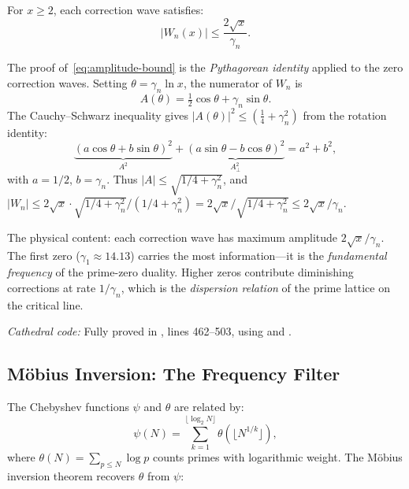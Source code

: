 \begin{theorem}
For $x \geq 2$, each correction wave satisfies:
\begin{equation}
  |W_n(x)| \leq \frac{2\sqrt{x}}{\gamma_n}.
  \label{eq:amplitude-bound}
\end{equation}
\end{theorem}

\begin{correspondence}
\label{corr:pythagorean}
The proof of~\eqref{eq:amplitude-bound} is the \emph{Pythagorean
identity} applied to the zero correction waves. Setting
$\theta = \gamma_n \ln x$, the numerator of $W_n$ is
\[
  A(\theta) = \tfrac{1}{2}\cos\theta + \gamma_n \sin\theta.
\]
The Cauchy--Schwarz inequality gives
$|A(\theta)|^2 \leq (\tfrac{1}{4} + \gamma_n^2)$ from the
rotation identity:
\[
  \underbrace{(a\cos\theta + b\sin\theta)^2}_{A^2}
  + \underbrace{(a\sin\theta - b\cos\theta)^2}_{A_\perp^2}
  = a^2 + b^2,
\]
with $a = 1/2$, $b = \gamma_n$. Thus
$|A| \leq \sqrt{1/4 + \gamma_n^2}$, and
$|W_n| \leq 2\sqrt{x} \cdot \sqrt{1/4+\gamma_n^2}/(1/4+\gamma_n^2)
= 2\sqrt{x}/\sqrt{1/4+\gamma_n^2} \leq 2\sqrt{x}/\gamma_n$.

The physical content: each correction wave has maximum amplitude
$2\sqrt{x}/\gamma_n$. The first zero ($\gamma_1 \approx 14.13$) carries
the most information---it is the \emph{fundamental frequency} of the
prime-zero duality. Higher zeros contribute diminishing corrections at
rate $1/\gamma_n$, which is the \emph{dispersion relation} of the
prime lattice on the critical line.

\emph{Cathedral code:} Fully proved in ,
lines 462--503, using  and
.
\end{correspondence}

\subsection{M\"obius Inversion: The Frequency Filter}

The Chebyshev functions $\psi$ and $\theta$ are related by:
\begin{equation}
  \psi(N) = \sum_{k=1}^{\lfloor \log_2 N \rfloor} \theta(\lfloor N^{1/k} \rfloor),
  \label{eq:psi-sum-theta}
\end{equation}
where $\theta(N) = \sum_{p \leq N} \log p$ counts primes with
logarithmic weight. The M\"obius inversion theorem recovers $\theta$
from $\psi$:

